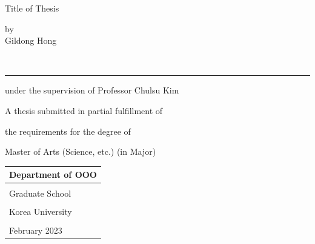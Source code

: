 \documentclass{report}
\begin{document}
\newpage 
\begin{center}
\huge Title of Thesis %
\par\vspace{50pt}
\Large by\\
Gildong Hong %
\par\vspace{20pt}
{\small\color{gray}{student signiture}}\\[-15pt]
\rule{.6\textwidth}{0.4pt}
\par\vspace{20pt}
under the supervision of Professor Chulsu Kim %
\par\vspace{20pt}
A thesis submitted in partial fulfillment of \par
the requirements for the degree of \par
Master of Arts (Science, etc.) (in Major) %
\par\vspace{10pt}
\end{center}
\noindent
\begin{tabularx}{\textwidth}{| >{\centering\arraybackslash}X |}
\arrayrulecolor{lgray}
\hline
\Large Department of OOO \\\hline %
\rule{0pt}{30pt}\\\hline
\LARGE Graduate School \\\hline
\\[-8pt]\hline
\LARGE Korea University \\\hline
\rule{0pt}{20pt}\\\hline
\large February 2023 \\\hline %
\end{tabularx}
\end{document}
